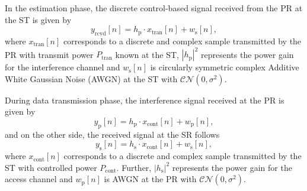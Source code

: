 \documentclass[letterpaper, twocolumn]{IEEEtran}
\newcommand{\e}[2]{{\mathbb E}_{#1}\left[ #2 \right]}
\newcommand{\s}[2]{{\frac{1}{{#1}}\sum_n^{#1}} {#2}}
\newcommand{\sub}[1]{_{\text{#1}}}
\newcommand{\preg}{P\sub{cont}}
\newcommand{\xreg}{x\sub{cont}}
\newcommand{\prcvd}{P\sub{rcvd}}
\newcommand{\yrcvd}{y\sub{rcvd}}
\newcommand{\ptran}{P\sub{tran}}
\newcommand{\xtran}{x\sub{tran}}
\newcommand{\pp}{P\sub{p}}
\newcommand{\ps}{P\sub{s}}
\newcommand{\yp}{y\sub{p}}
\newcommand{\ys}{y\sub{s}}
\newcommand{\nap}{w\sub{p}}
\newcommand{\nas}{w\sub{s}}
\newcommand{\gp}{h\sub{p}}
\newcommand{\gs}{h\sub{s}}
\newcommand{\pgp}{|h\sub{p}|^2}
\newcommand{\pgs}{|h\sub{s}|^2}
\newcommand{\npp}{\sigma^2\sub{p}}
\newcommand{\nps}{\sigma^2}
\newcommand{\fsam}{f\sub{s}}
\begin{document}
In the estimation phase, the discrete control-based signal received from the PR at the ST is given by \cite{Kaushik15}
\begin{equation}
\yrcvd[n] = \gp \cdot \xtran[n] + \nas[n],
\label{eq:sys_mod_st}
\end{equation}
where $\xtran[n]$ corresponds to a discrete and complex sample transmitted by the PR with transmit power $\ptran$ known at the ST, $\pgp$ represents the power gain for the interference channel and $\nas[n]$ is circularly symmetric complex Additive White Gaussian Noise (AWGN) at the ST with %
$\mathcal{CN}(0, \nps)$. %

During data transmission phase, the interference signal received at the PR is given by
\begin{equation}
\yp[n] = \gp  \cdot \xreg[n] + \nap[n],
\label{eq:sys_mod_pr}
\end{equation}
and on the other side, the received signal at the SR follows 
\begin{equation}
\ys[n] = \gs \cdot \xreg[n] + \nas[n],
\label{eq:sys_mod_sr}
\end{equation}
where $\xreg[n]$ corresponds to a discrete and complex sample transmitted by the ST with controlled power $\preg$. Further, $\pgs$ represents the power gain for the access channel and $\nap[n]$ is AWGN at the PR with $\mathcal{CN}(0, \nps)$. %
\end{document}
